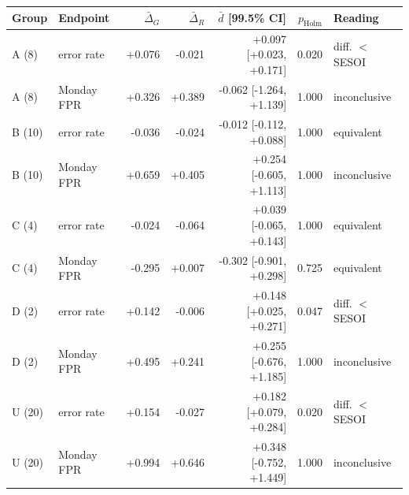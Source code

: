 \begin{tabular}{@{}llrrrrl@{}}
\toprule
Group & Endpoint & $\bar\Delta_G$ & $\bar\Delta_R$ & $\bar d$ [99.5\% CI] & $p_{\mathrm{Holm}}$ & Reading \\
\midrule
A (8) & error rate & +0.076 & -0.021 & +0.097 [+0.023, +0.171] & 0.020 & diff. $<$ SESOI \\
A (8) & Monday FPR & +0.326 & +0.389 & -0.062 [-1.264, +1.139] & 1.000 & inconclusive \\
B (10) & error rate & -0.036 & -0.024 & -0.012 [-0.112, +0.088] & 1.000 & equivalent \\
B (10) & Monday FPR & +0.659 & +0.405 & +0.254 [-0.605, +1.113] & 1.000 & inconclusive \\
C (4) & error rate & -0.024 & -0.064 & +0.039 [-0.065, +0.143] & 1.000 & equivalent \\
C (4) & Monday FPR & -0.295 & +0.007 & -0.302 [-0.901, +0.298] & 0.725 & equivalent \\
D (2) & error rate & +0.142 & -0.006 & +0.148 [+0.025, +0.271] & 0.047 & diff. $<$ SESOI \\
D (2) & Monday FPR & +0.495 & +0.241 & +0.255 [-0.676, +1.185] & 1.000 & inconclusive \\
U (20) & error rate & +0.154 & -0.027 & +0.182 [+0.079, +0.284] & 0.020 & diff. $<$ SESOI \\
U (20) & Monday FPR & +0.994 & +0.646 & +0.348 [-0.752, +1.449] & 1.000 & inconclusive \\
\bottomrule
\end{tabular}
